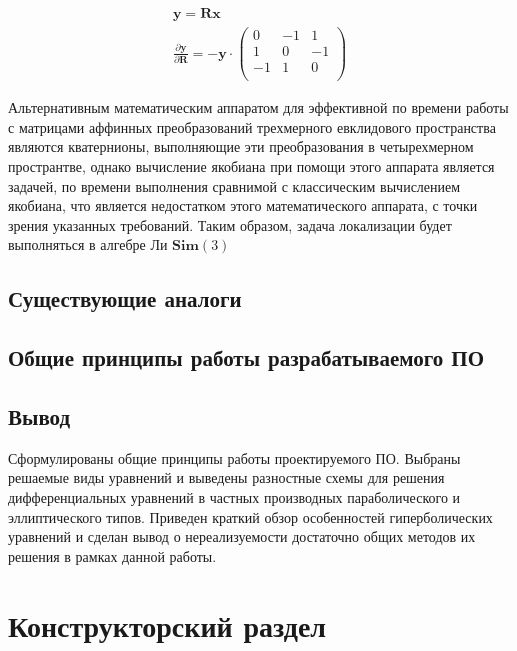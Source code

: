 \begin{itemize}
    \begin{equation}
        \begin{align*}
            \mathbf{y} = \mathbf{R}\mathbf{x} \\
            \frac{\partial\mathbf{y}}{\partial\mathbf{R}}
            = -\mathbf{y} \cdot
            \begin{pmatrix}
            0 & -1 & 1 \\
            1 & 0 & -1 \\
            -1 & 1 & 0 \\
            \end{pmatrix}
        \end{align*}
    \end{equation}
\end{itemize}


Альтернативным математическим аппаратом для эффективной по времени работы с матрицами аффинных преобразований трехмерного евклидового пространства являются кватернионы, выполняющие эти преобразования в четырехмерном пространтве, однако вычисление якобиана при помощи этого аппарата является задачей, по времени выполнения сравнимой с классическим вычислением якобиана, что является недостатком этого математического аппарата, с точки зрения указанных требований. Таким образом, задача локализации будет выполняться в алгебре Ли $\textbf{Sim}(3)$

\subsection{Существующие аналоги}

\subsection{Общие принципы работы разрабатываемого ПО}


\subsection{Вывод}
Сформулированы общие принципы работы проектируемого ПО. Выбраны 
решаемые виды уравнений и выведены разностные схемы для решения 
дифференциальных уравнений в частных производных параболического и 
эллиптического типов. Приведен краткий обзор особенностей гиперболических 
уравнений и сделан вывод о нереализуемости достаточно общих методов их решения 
в рамках данной работы.

\section{Конструкторский раздел}

